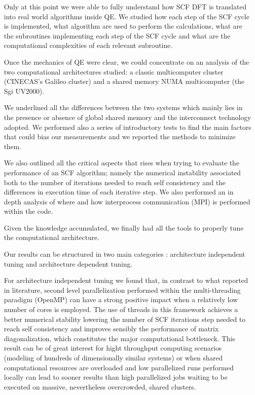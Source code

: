 \documentclass[a4paper,12pt]{article}
\begin{document}
Only at this point we were able to fully understand how SCF DFT is translated into real world algorithms inside QE.
We studied how each step of the SCF cycle is implemented, what algorithm are used to perform the calculations, what are the subroutines implementing each step of the SCF cycle and what are the computational complexities of each relevant subroutine.

Once the mechanics of QE were clear, we could concentrate on an analysis of the two computational architectures studied:
a classic multicomputer cluster (CINECAS's Galileo cluster) and a shared memory NUMA multicomputer (the Sgi UV2000).

We underlined all the differences between the two systems which mainly lies in the presence or absence of global shared memory and the interconnect technology adopted. 
We performed also a series of introductory tests to find the main factors that could bias our measurements and we reported the methods to minimize them.

We also outlined all the critical aspects that rises when trying to evaluate the performance of an SCF algorithm; namely the numerical instability associated both to the number of iterations needed to reach self consistency and the differences in execution time of each iterative step.
We also performed an in depth analysis of where and how interprocess communication (MPI) is performed within the code.

Given the knowledge accumulated, we finally had all the tools to properly tune the computational architecture.

Our results can be structured in two main categories : architecture independent tuning and architecture dependent tuning.

For architecture independent tuning we found that, in contrast to what reported in literature, second level parallelization performed within the multi-threading paradigm (OpenMP) can have a strong positive impact when a relatively low number of cores is employed.
The use of threads in this framework achieves a better numerical stability lowering the number of SCF iterations step needed to reach self consistency and improves sensibly the performance of matrix diagonalization, which constitutes the major computational bottleneck.
This result can be of great interest for hight throughput computing scenarios (modeling of hundreds of dimensionally similar systems) or when shared computational resources are overloaded and low parallelized runs performed locally can lead to sooner results than high parallelized jobs waiting to be executed on massive, nevertheless overcrowded, shared clusters.
\end{document}
